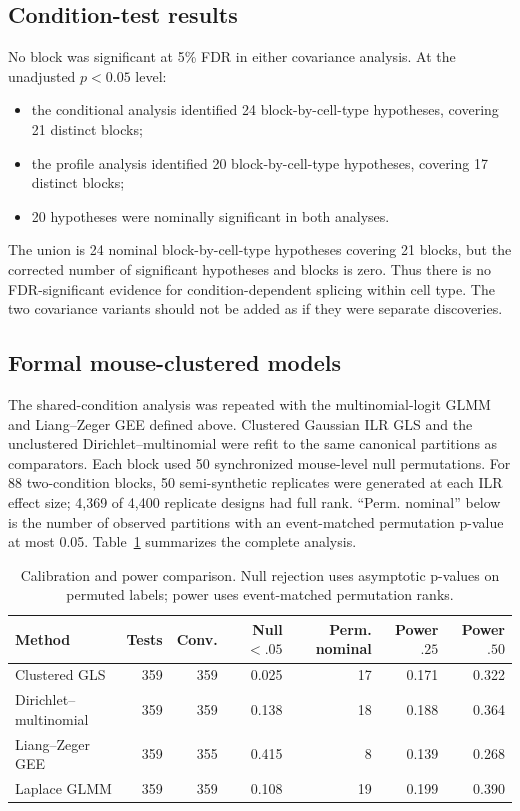 \documentclass[11pt]{article}
\begin{document}
\subsection*{Condition-test results}

No block was significant at 5\% FDR in either covariance analysis. At the unadjusted \(p<0.05\) level:
\begin{itemize}[leftmargin=*]
  \item the conditional analysis identified 24 block-by-cell-type hypotheses, covering 21 distinct blocks;
  \item the profile analysis identified 20 block-by-cell-type hypotheses, covering 17 distinct blocks;
  \item 20 hypotheses were nominally significant in both analyses.
\end{itemize}
The union is 24 nominal block-by-cell-type hypotheses covering 21 blocks, but the corrected number of significant hypotheses and blocks is zero. Thus there is no FDR-significant evidence for condition-dependent splicing within cell type. The two covariance variants should not be added as if they were separate discoveries.

\subsection*{Formal mouse-clustered models}

The shared-condition analysis was repeated with the multinomial-logit GLMM and Liang--Zeger GEE defined above. Clustered Gaussian ILR GLS and the unclustered Dirichlet--multinomial were refit to the same canonical partitions as comparators. Each block used 50 synchronized mouse-level null permutations. For 88 two-condition blocks, 50 semi-synthetic replicates were generated at each ILR effect size; 4,369 of 4,400 replicate designs had full rank. ``Perm. nominal'' below is the number of observed partitions with an event-matched permutation p-value at most 0.05. Table~\ref{tab:clustered-power} summarizes the complete analysis.

\begin{table}[H]
\centering
\caption{Calibration and power comparison. Null rejection uses asymptotic p-values on permuted labels; power uses event-matched permutation ranks.}
\label{tab:clustered-power}
\begin{tabular}{lrrrrrr}
\toprule
Method & Tests & Conv. & Null $<.05$ & Perm. nominal & Power $.25$ & Power $.50$\\
\midrule
Clustered GLS & 359 & 359 & 0.025 & 17 & 0.171 & 0.322\\
Dirichlet--multinomial & 359 & 359 & 0.138 & 18 & 0.188 & 0.364\\
Liang--Zeger GEE & 359 & 355 & 0.415 & 8 & 0.139 & 0.268\\
Laplace GLMM & 359 & 359 & 0.108 & 19 & 0.199 & 0.390\\
\bottomrule
\end{tabular}
\end{table}
\end{document}
